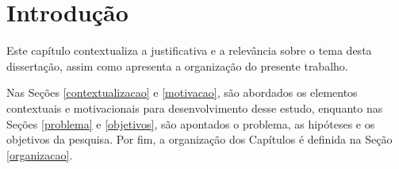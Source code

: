 \chapter{Introdução}
\label{chap:intro}

Este capítulo contextualiza a justificativa e a relevância sobre o tema desta dissertação, assim como apresenta a organização do presente trabalho. 

Nas Seções \ref{contextualizacao} e \ref{motivacao}, são abordados os elementos contextuais e motivacionais para desenvolvimento desse estudo, enquanto nas Seções \ref{problema} e \ref{objetivos}, são apontados o problema, as hipóteses e os objetivos da pesquisa. Por fim, a organização dos Capítulos é definida na Seção \ref{organizacao}.

 

  
  
  
 
 
      
 

 
% 
 
% 

%

%

%  
